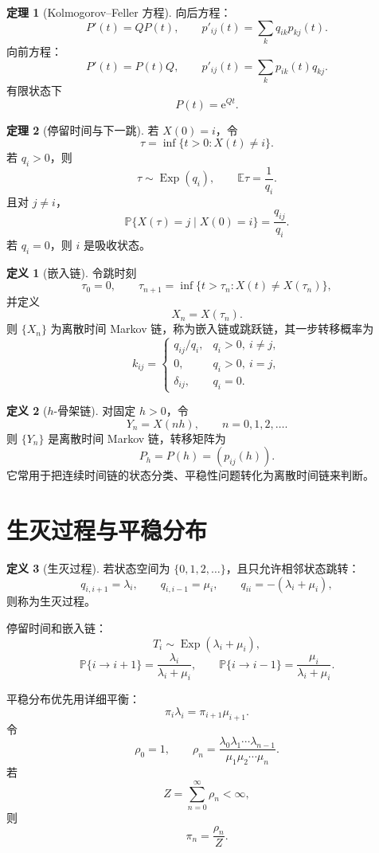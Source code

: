 \documentclass[12pt,a4paper,openany]{ctexrep}
\theoremstyle{definition}
\newtheorem{definition}{定义}[section]
\newtheorem{theorem}{定理}[section]
\newcommand{\E}{\mathbb{E}}
\newcommand{\Pp}{\mathbb{P}}
\newcommand{\Exp}{\operatorname{Exp}}
\newcommand{\e}{\mathrm{e}}
\begin{document}
\begin{theorem}[Kolmogorov--Feller 方程]
向后方程：
\[
P'(t)=QP(t),\qquad
p'_{ij}(t)=\sum_kq_{ik}p_{kj}(t).
\]
向前方程：
\[
P'(t)=P(t)Q,\qquad
p'_{ij}(t)=\sum_kp_{ik}(t)q_{kj}.
\]
有限状态下
\[
P(t)=\e^{Qt}.
\]
\end{theorem}

\begin{theorem}[停留时间与下一跳]
若 $X(0)=i$，令
\[
\tau=\inf\{t>0:X(t)\ne i\}.
\]
若 $q_i>0$，则
\[
\tau\sim\Exp(q_i),\qquad \E\tau=\frac1{q_i}.
\]
且对 $j\ne i$，
\[
\Pp\{X(\tau)=j\mid X(0)=i\}=\frac{q_{ij}}{q_i}.
\]
若 $q_i=0$，则 $i$ 是吸收状态。
\end{theorem}

\begin{definition}[嵌入链]
令跳时刻
\[
\tau_0=0,\qquad \tau_{n+1}=\inf\{t>\tau_n:X(t)\ne X(\tau_n)\},
\]
并定义
\[
X_n=X(\tau_n).
\]
则 $\{X_n\}$ 为离散时间 Markov 链，称为嵌入链或跳跃链，其一步转移概率为
\[
k_{ij}=
\begin{cases}
q_{ij}/q_i,&q_i>0,\ i\ne j,\\
0,&q_i>0,\ i=j,\\
\delta_{ij},&q_i=0.
\end{cases}
\]
\end{definition}

\begin{definition}[$h$-骨架链]
对固定 $h>0$，令
\[
Y_n=X(nh),\qquad n=0,1,2,\dots .
\]
则 $\{Y_n\}$ 是离散时间 Markov 链，转移矩阵为
\[
P_h=P(h)=(p_{ij}(h)).
\]
它常用于把连续时间链的状态分类、平稳性问题转化为离散时间链来判断。
\end{definition}

\section{生灭过程与平稳分布}

\begin{definition}[生灭过程]
若状态空间为 $\{0,1,2,\dots\}$，且只允许相邻状态跳转：
\[
q_{i,i+1}=\lambda_i,\qquad q_{i,i-1}=\mu_i,\qquad
q_{ii}=-(\lambda_i+\mu_i),
\]
则称为生灭过程。
\end{definition}

停留时间和嵌入链：
\[
T_i\sim\Exp(\lambda_i+\mu_i),
\]
\[
\Pp\{i\to i+1\}=\frac{\lambda_i}{\lambda_i+\mu_i},\qquad
\Pp\{i\to i-1\}=\frac{\mu_i}{\lambda_i+\mu_i}.
\]

平稳分布优先用详细平衡：
\[
\pi_i\lambda_i=\pi_{i+1}\mu_{i+1}.
\]
令
\[
\rho_0=1,\qquad
\rho_n=\frac{\lambda_0\lambda_1\cdots\lambda_{n-1}}
{\mu_1\mu_2\cdots\mu_n}.
\]
若
\[
Z=\sum_{n=0}^{\infty}\rho_n<\infty,
\]
则
\[
\pi_n=\frac{\rho_n}{Z}.
\]
\end{document}
